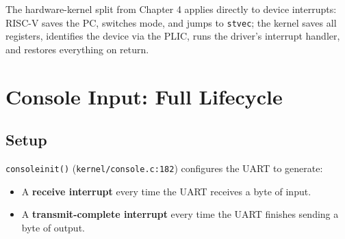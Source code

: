 \documentclass[11pt, a4paper]{article}
\begin{document}
\begin{tcolorbox}[summary, title={Section Summary}]
The hardware-kernel split from Chapter 4 applies directly to device interrupts: RISC-V saves the PC, switches mode, and jumps to \lstinline|stvec|; the kernel saves all registers, identifies the device via the PLIC, runs the driver's interrupt handler, and restores everything on return.
\end{tcolorbox}

\section{Console Input: Full Lifecycle}

\subsection{Setup}

\lstinline|consoleinit()| (\lstinline|kernel/console.c:182|) configures the UART to generate:
\begin{itemize}[leftmargin=1.5em]
  \item A \textbf{receive interrupt} every time the UART receives a byte of input.
  \item A \textbf{transmit-complete interrupt} every time the UART finishes sending a byte of output.
\end{itemize}
\end{document}
